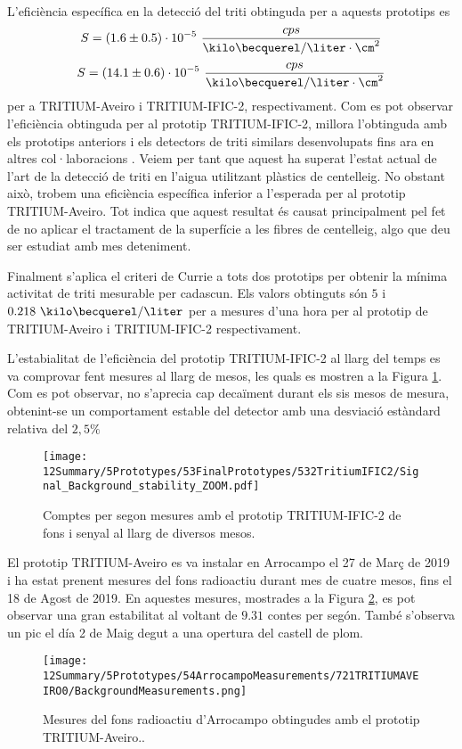 L'eficiència específica en la detecció del triti obtinguda per a aquests prototips es
$$S = (1.6 \pm 0.5)\cdot{} 10^{-5}~\frac{cps}{\kilo\becquerel/\liter \cdot{} \cm^{2}}$$
$$S = (14.1 \pm 0.6)\cdot{} 10^{-5}~\frac{cps}{\kilo\becquerel/\liter \cdot{} \cm^{2}}$$
per a TRITIUM-Aveiro i TRITIUM-IFIC-2, respectivament. Com es pot observar l'eficiència obtinguda per al prototip TRITIUM-IFIC-2, millora l'obtinguda amb els prototips anteriors i els detectors de triti similars desenvolupats fins ara en altres col·laboracions \cite{Hofstetter1, Hofstetter2}. Veiem per tant que aquest ha superat l'estat actual de l'art de la detecció de triti en l'aigua utilitzant plàstics de centelleig. No obstant això, trobem una eficiència específica inferior a l'esperada per al prototip TRITIUM-Aveiro. Tot indica que aquest resultat és causat principalment pel fet de no aplicar el tractament de la superfície a les fibres de centelleig, algo que deu ser estudiat amb mes deteniment.

Finalment s'aplica el criteri de Currie \cite{CurieLimit} a tots dos prototips per obtenir la mínima activitat de triti mesurable per cadascun. Els valors obtinguts són $5$ i $0.218~\kilo\becquerel/\liter$ per a mesures d'una hora per al prototip de TRITIUM-Aveiro i TRITIUM-IFIC-2 respectivament. 

L'estabialitat de l'eficiència del prototip TRITIUM-IFIC-2 al llarg del temps es va comprovar fent mesures al llarg de mesos, les quals es mostren a la Figura \ref{fig:MonitoritzacioTRITIUMIFIC2}. Com es pot observar, no s'aprecia cap decaïment durant els sis mesos de mesura, obtenint-se un comportament estable del detector amb una desviació estàndard relativa del $2,5\%$

\begin{figure}[h]
\centering
\texttt{[image: 12Summary/5Prototypes/53FinalPrototypes/532TritiumIFIC2/Signal\_Background\_stability\_ZOOM.pdf]}
\caption{Comptes per segon mesures amb el prototip TRITIUM-IFIC-2 de fons i senyal al llarg de diversos mesos.\label{fig:MonitoritzacioTRITIUMIFIC2}}
\end{figure}

El prototip TRITIUM-Aveiro es va instalar en Arrocampo el 27 de Març de 2019 i ha estat prenent mesures del fons radioactiu durant mes de cuatre mesos, fins el 18 de Agost de 2019. En aquestes mesures, mostrades a la Figura \ref{fig:FonsArrocampoAveiro}, es pot observar una gran estabilitat al voltant de $9.31$ contes per segón. També s'observa un pic el día 2 de Maig degut a una opertura del castell de plom.

\begin{figure}[h]
\centering
\texttt{[image: 12Summary/5Prototypes/54ArrocampoMeasurements/721TRITIUMAVEIRO0/BackgroundMeasurements.png]}
\caption{Mesures del fons radioactiu d'Arrocampo obtingudes amb el prototip TRITIUM-Aveiro.\cite{ExperimentalPaperCarlos}.\label{fig:FonsArrocampoAveiro}}
\end{figure}